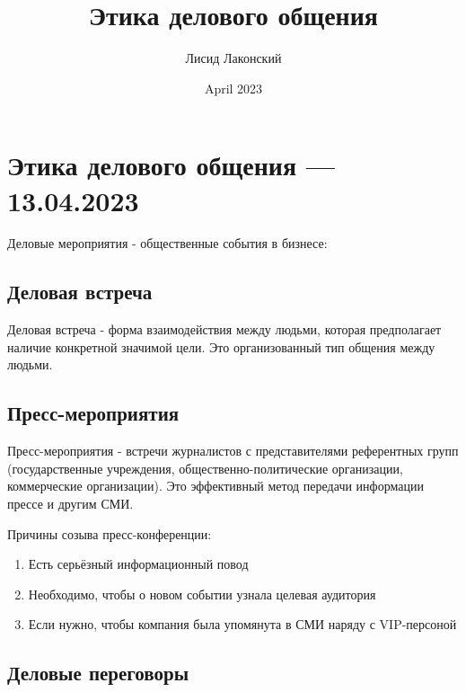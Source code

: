 \documentclass{article}
\title{Этика делового общения}
\author{Лисид Лаконский}
\date{April 2023}
\begin{document}
\raggedright

\maketitle
\tableofcontents
\pagebreak

\section{Этика делового общения — 13.04.2023}

Деловые мероприятия - общественные события в бизнесе:

\begin{multienumerate}
\end{multienumerate}

\subsection{Деловая встреча}

Деловая встреча - форма взаимодействия между людьми, которая предполагает наличие конкретной значимой цели. Это организованный тип общения между людьми.

\subsection{Пресс-мероприятия}

Пресс-мероприятия - встречи журналистов с представителями референтных групп (государственные учреждения, общественно-политические организации, коммерческие организации). Это эффективный метод передачи информации прессе и другим СМИ.

Причины созыва пресс-конференции:

\begin{enumerate}
    \item Есть серьёзный информационный повод
    \item Необходимо, чтобы о новом событии узнала целевая аудитория
    \item Если нужно, чтобы компания была упомянута в СМИ наряду с VIP-персоной
\end{enumerate}

\subsection{Деловые переговоры}
\end{document}
